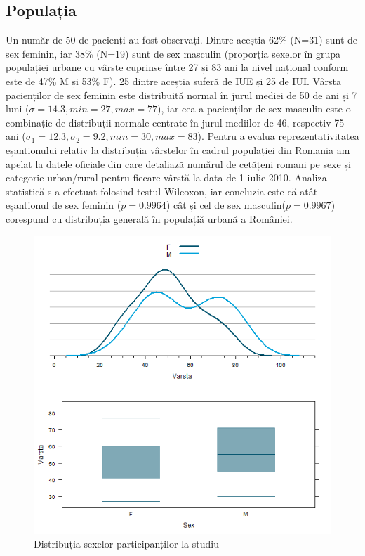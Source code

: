 \documentclass[12pt]{article}
\begin{document}
\subsection{Populația}
 \label{rezPop}
  Un număr de 50 de pacienți au fost observați. Dintre aceștia 62\% (N=31) sunt de sex feminin, iar 38\% (N=19) sunt de sex masculin (proporția sexelor în grupa populației urbane cu vârste cuprinse între 27 și 83 ani la nivel național conform \citep{insee2011} este de 47\% M și 53\% F). 25 dintre aceștia suferă de \ac{IUE} și 25 de \ac{IUI}.
  Vârsta pacienților de sex feminin este distribuită normal în jurul mediei de 50 de ani și 7 luni ($\sigma=14.3,min=27,max=77$), iar cea a pacienților de sex masculin este o combinație de distribuții normale centrate în jurul mediilor de 46,  respectiv 75 ani ($\sigma_{1}=12.3 , \sigma_{2}=9.2,min=30,max=83$).
  Pentru a evalua reprezentativitatea eșantionului relativ la distribuția vârstelor în cadrul populației din Romania am apelat la datele oficiale din \citep{insee2011} care detaliază numărul de cetățeni romani pe sexe și categorie urban/rural pentru fiecare vârstă la data de 1 iulie 2010. 
  Analiza statistică s-a efectuat folosind testul Wilcoxon, iar concluzia este că atât eșantionul de sex feminin ($p=0.9964$) cât și cel de sex masculin($p=0.9967$) corespund cu distribuția generală în populațiă urbană a României.
  \begin{figure}[H]
   \centering
   \includegraphics[width=0.8\linewidth]{incoVarstaSex}
   \caption{Distribuția sexelor participanților la studiu}
   \label{fig:Distributia sexelor participantilor la studiu}
  \end{figure}
\end{document}

